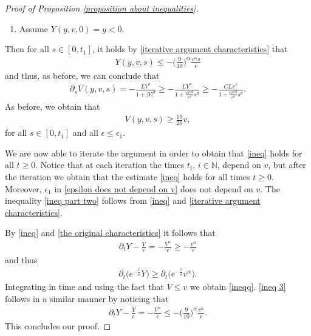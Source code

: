 \documentclass[11pt]{article}
\numberwithin{equation}{section}
\begin{document}
\begin{proof}[Proof of Proposition \ref{proposition about inequalities}]
     \begin{enumerate}\item[iii)]    Assume $Y(y,v,0)=y<0$. \end{enumerate}Then for all $s\in[0,t_{1}]$, it holds by  \eqref{iterative argument characteristics} that
  \begin{align}
Y(y,v,s)\leq -\Big(\frac{9}{10}\Big)^{\alpha}\frac{v^{\alpha}s}{\epsilon}
  \end{align}
        and thus, as before, we can conclude that
        \begin{align*}
    \partial_{s}{V}(y,v,s)=-\frac{{L}{V}^{\gamma}}{1+|{Y}|^{d}}\geq -\frac{{L}{V}^{\gamma}}{1+\frac{c v^{\alpha d}}{\epsilon^{d}}s^{d}}\geq -\frac{C{L}{v}^{\gamma}}{1+\frac{c v^{\alpha d}}{\epsilon^{d}}s^{d}}.
\end{align*}
        As before, we obtain that \begin{align}
    V(y,v,s)\geq \frac{19}{20}v,
\end{align}
for all $s\in[0,t_{1}]$ and all $\epsilon\leq \epsilon_{1}$. 



We are now able to iterate the argument in order to obtain that \eqref{ineq} holds for all $t\geq 0$. Notice that at each iteration the times $t_{i}$, $i\in\mathbb{N}$, depend on $v$, but after the iteration we obtain that the estimate \eqref{ineq} holds for all times $t\geq 0$. Moreover, $\epsilon_{1}$ in \eqref{epsilon does not depend on v} does not depend on $v$. The inequality \eqref{ineq part two} follows from \eqref{ineq} and \eqref{iterative argument characteristics}.

By \eqref{ineq} and \eqref{the original characteristics} it follows that
\begin{align*}
    \partial_{t}Y-\frac{Y}{\epsilon}=-\frac{V^{\alpha}}{\epsilon}\geq -\frac{v^{\alpha}}{\epsilon}
\end{align*}
     and thus 
     \begin{align*}
         \partial_{t}\bigg(e^{-\frac{t}{\epsilon}}Y\bigg )\geq \partial_{t}\bigg(e^{-\frac{t}{\epsilon}}v^{\alpha}\bigg).
     \end{align*}
    Integrating in time and using the fact that $V\leq v$ we obtain \eqref{ineqq}. \eqref{ineq 3} follows in a similar manner by noticing that
    \begin{align*}
           \partial_{t}Y-\frac{Y}{\epsilon}=-\frac{V^{\alpha}}{\epsilon}\leq  -\Big(\frac{9}{10}\Big)^{\alpha}\frac{v^{\alpha}}{\epsilon}.
    \end{align*}
This concludes our proof.
  \end{proof}
\end{document}
